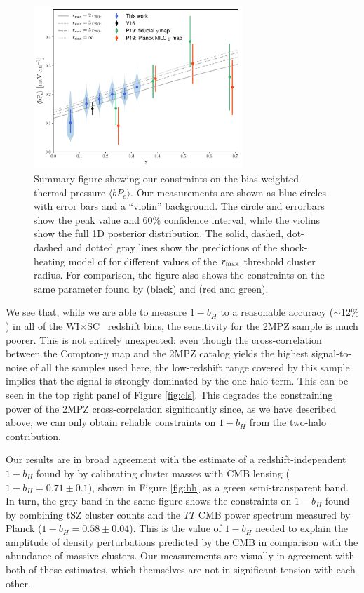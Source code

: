 \documentclass[useAMS,usenatbib]{mn2e}
\newcommand{\wisc}{WI$\times$SC}
\begin{document}
      \begin{figure}
        \centering
        \includegraphics[width=0.7\textwidth]{by.pdf}
        \caption{Summary figure showing our constraints on the bias-weighted thermal pressure $\langle bP_e\rangle$. Our measurements are shown as blue circles with error bars and a ``violin'' background. The circle and errorbars show the peak value and 60\% confidence interval, while the violins show the full 1D posterior distribution. The solid, dashed, dot-dashed and dotted gray lines show the predictions of the shock-heating model of \citet{2012ApJ...758...75B} for different values of the $r_{\rm max}$ threshold cluster radius. For comparison, the figure also shows the constraints on the same parameter found by \citet{2017MNRAS.467.2315V} (black) and \citet{2019arXiv190413347P} (red and green).}
        \label{fig:by}
      \end{figure}
      
      We see that, while we are able to measure $1-b_H$ to a reasonable accuracy ($\sim12\%$) in all of the \wisc~ redshift bins, the sensitivity for the 2MPZ sample is much poorer. This is not entirely unexpected: even though the cross-correlation between the Compton-$y$ map and the 2MPZ catalog yields the highest signal-to-noise of all the samples used here, the low-redshift range covered by this sample implies that the signal is strongly dominated by the one-halo term. This can be seen in the top right panel of Figure \ref{fig:cls}. This degrades the constraining power of the 2MPZ cross-correlation significantly since, as we have described above, we can only obtain reliable constraints on $1-b_H$ from the two-halo contribution.
            
      Our results are in broad agreement with the estimate of a redshift-independent $1-b_H$ found by \cite{2019arXiv190407887Z} by calibrating cluster masses with CMB lensing ($1-b_H=0.71\pm0.1$), shown in Figure \ref{fig:bh} as a green semi-transparent band. In turn, the grey band in the same figure shows the constraints on $1-b_H$ found by combining tSZ cluster counts and the $TT$ CMB power spectrum measured by Planck \cite{2016A&A...594A..24P} ($1-b_H=0.58\pm0.04$). This is the value of $1-b_H$ needed to explain the amplitude of density perturbations predicted by the CMB in comparison with the abundance of massive clusters. Our measurements are visually in agreement with both of these estimates, which themselves are not in significant tension with each other.
      
\end{document}
